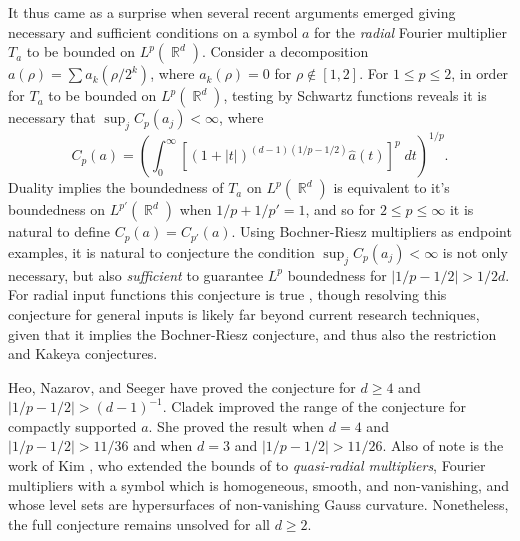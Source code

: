 \documentclass[11pt]{article}
\DeclareMathOperator{\RR}{\mathbb{R}}
\begin{document}
It thus came as a surprise when several recent arguments \cites{GarrigosSeeger,HeoNazarovSeeger,Cladek,KimQuasiradial} emerged giving necessary and sufficient conditions on a symbol $a$ for the \emph{radial} Fourier multiplier $T_a$ to be bounded on $L^p(\RR^d)$.
Consider a decomposition $a(\rho) = \sum a_k( \rho / 2^k)$, where $a_k(\rho) = 0$ for $\rho \not \in [1,2]$. For $1 \leq p \leq 2$, in order for $T_a$ to be bounded on $L^p(\RR^d)$, testing by Schwartz functions reveals it is necessary that $\sup_j C_p(a_j) < \infty$, where
%
\[ C_p(a) = \left( \int_0^\infty \left[ (1 + |t|)^{(d-1)(1/p - 1/2)} \widehat{a}(t) \right]^p\; dt \right)^{1/p}. \] %
%
Duality implies the boundedness of $T_a$ on $L^p(\RR^d)$ is equivalent to it's boundedness on $L^{p'}(\RR^d)$ when $1/p + 1/p' = 1$, and so for $2 \leq p \leq \infty$ it is natural to define $C_p(a) = C_{p'}(a)$. Using Bochner-Riesz multipliers as endpoint examples, it is natural to conjecture the condition $\sup_j C_p(a_j) < \infty$ is not only necessary, but also \emph{sufficient} to guarantee $L^p$ boundedness for $|1/p - 1/2| > 1/2d$. For radial input functions this conjecture is true \cite{GarrigosSeeger}, though resolving this conjecture for general inputs is likely far beyond current research techniques, given that it implies the Bochner-Riesz conjecture, and thus also the restriction and Kakeya conjectures.

Heo, Nazarov, and Seeger \cite{HeoNazarovSeeger} have proved the conjecture for $d \geq 4$ and $|1/p - 1/2| > (d-1)^{-1}$. Cladek \cite{Cladek} improved the range of the conjecture for compactly supported $a$. She proved the result when $d = 4$ and $|1/p - 1/2| > 11/36$ and when $d = 3$ and $|1/p - 1/2| > 11/26$. Also of note is the work of Kim \cite{KimQuasiradial}, who extended the bounds of \cite{HeoNazarovSeeger} to \emph{quasi-radial multipliers}, Fourier multipliers with a symbol which is homogeneous, smooth, and non-vanishing, and whose level sets are hypersurfaces of non-vanishing Gauss curvature. Nonetheless, the full conjecture remains unsolved for all $d \geq 2$.
\end{document}
